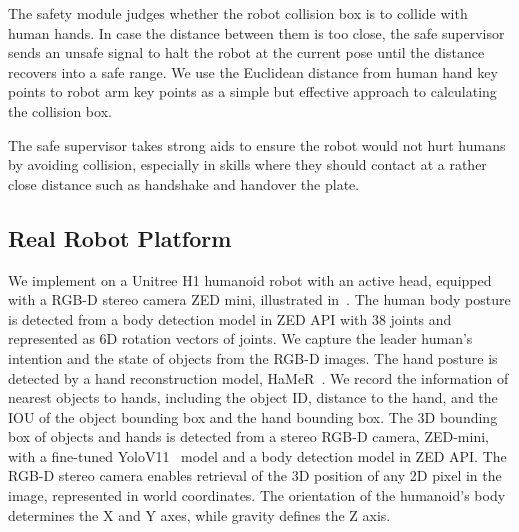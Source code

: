 The safety module judges whether the robot collision box is to collide with human hands. 
In case the distance between them is too close, the safe supervisor sends an unsafe signal to halt the robot at the current pose until the distance recovers into a safe range.
We use the Euclidean distance from human hand key points to robot arm key points as a simple but effective approach to calculating the collision box. 

The safe supervisor takes strong aids to ensure the robot would not hurt humans by avoiding collision, especially in skills where they should contact at a rather close distance such as handshake and handover the plate.

\subsection{Real Robot Platform}


\label{method:real-robot}

% 
We implement \our on a Unitree H1 humanoid robot with an active head, equipped with a RGB-D stereo camera ZED mini, illustrated in~.
The human body posture is detected from a body detection model in ZED API with 38 joints and represented as 6D rotation vectors of joints. 
We capture the leader human's intention and the state of objects from the RGB-D images.
The hand posture is detected by a hand reconstruction model, HaMeR~\citep{pavlakos2024reconstructing}.
We record the information of nearest objects to hands, including the object ID, distance to the hand, and the IOU of the object bounding box and the hand bounding box.
The 3D bounding box of objects and hands is detected from a stereo RGB-D camera, ZED-mini, with a fine-tuned YoloV11~\citep{khanam2024yolov11} model and a body detection model in ZED API. 
The RGB-D stereo camera enables retrieval of the 3D position of any 2D pixel in the image, represented in world coordinates. The orientation of the humanoid's body determines the X and Y axes, while gravity defines the Z axis.
